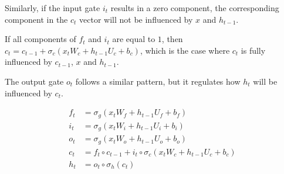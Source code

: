 Similarly, if the input gate $i_t$ results in a zero component, the corresponding component in the $c_t$ vector will not be influenced by $x$ and $h_{t-1}$.

If all components of $f_t$ and $i_t$ are equal to $1$, then $c_t = c_{t-1} + \sigma_c(x_t W_{c} + h_{t-1} U_{c} + b_c)$, which is the case where $c_t$ is fully influenced by $c_{t-1}$, $x$ and $h_{t-1}$.

The output gate $o_t$ follows a similar pattern, but it regulates how $h_t$ will be influenced by $c_t$.

\begin{align}
\label{eq:lstmequationsstart}     
f_t &= \sigma_g(x_t W_{f} + h_{t-1} U_{f} + b_f) \\
i_t &= \sigma_g(x_t W_{i} + h_{t-1} U_{i} + b_i) \\
o_t &= \sigma_g(x_t W_{o} + h_{t-1} U_{o} + b_o) \\
c_t &= f_t \circ c_{t-1} + i_t \circ \sigma_c(x_t W_{c} + h_{t-1} U_{c} + b_c) \\
\label{eq:lstmequationsend}
h_t &= o_t \circ \sigma_h(c_t)
    \end{align}
